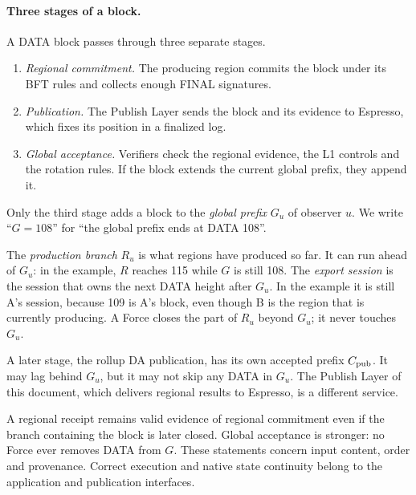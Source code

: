 \documentclass[11pt,a4paper]{article}
\newcommand{\defterm}[1]{\textcolor{rrBlue}{\textit{#1}}}
\begin{document}
\paragraph{Three stages of a block.}
A DATA block passes through three separate stages.
\begin{enumerate}
\item \emph{Regional commitment.} The producing region commits the block
under its BFT rules and collects enough FINAL signatures.
\item \emph{Publication.} The Publish Layer sends the block and its
evidence to Espresso, which fixes its position in a finalized log.
\item \emph{Global acceptance.} Verifiers check the regional evidence,
the L1 controls and the rotation rules. If the block extends the
current global prefix, they append it.
\end{enumerate}
Only the third stage adds a block to the \defterm{global prefix} $G_u$
of observer $u$. We write ``$G=108$'' for ``the global prefix ends at
DATA 108''.

The \defterm{production branch} $R_u$ is what regions have produced so
far. It can run ahead of $G_u$: in the example, $R$ reaches 115 while
$G$ is still 108. The \defterm{export session} is the session that owns
the next DATA height after $G_u$. In the example it is still A's
session, because 109 is A's block, even though B is the region that is
currently producing. A Force closes the part of $R_u$ beyond $G_u$; it
never touches $G_u$.

A later stage, the rollup DA publication, has its own accepted prefix
$C_{\rm pub}$. It may lag behind $G_u$, but it may not skip any DATA
in $G_u$. The Publish Layer of this document, which delivers regional
results to Espresso, is a different service.

A regional receipt remains valid evidence of regional commitment even
if the branch containing the block is later closed. Global acceptance is
stronger: no Force ever removes DATA from $G$. These statements concern
input content, order and provenance. Correct execution and native state
continuity belong to the application and publication interfaces.
\end{document}
